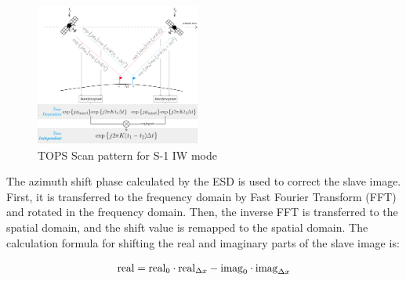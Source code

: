 \documentclass[a4paper,fleqn]{cas-dc}
\begin{document}
\begin{figure}
	\centering 
	\includegraphics[width=0.48\textwidth]{figure/The principle of ESD.png}	
	\caption{TOPS Scan pattern for S-1 IW mode} 
	\label{fig_2}%
\end{figure}

The azimuth shift phase calculated by the ESD is used to correct the slave image. First, it is transferred to the frequency domain by Fast Fourier Transform (FFT) and rotated in the frequency domain. Then, the inverse FFT is transferred to the spatial domain, and the shift value is remapped to the spatial domain. The calculation formula for shifting the real and imaginary parts of the slave image is: \par
\begin{equation}
    {\rm real} = {\rm real}_0 \cdot {\rm real}_{\Delta x} - {\rm imag}_0 \cdot {\rm imag}_{\Delta x}
\end{equation}
\end{document}
